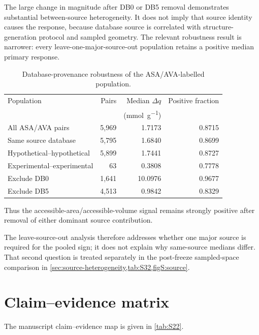\documentclass[11pt,a4paper]{article}
\begin{document}
The large change in magnitude after DB0 or DB5 removal demonstrates substantial
between-source heterogeneity. It does not imply that source identity causes the
response, because database source is correlated with structure-generation protocol
and sampled geometry. The relevant robustness result is narrower: every
leave-one-major-source-out population retains a positive median primary response.

\begin{table}[H]
\centering
\caption{Database-provenance robustness of the ASA/AVA-labelled population.}
\label{tab:S21}
\begin{tabular}{lrrr}
\toprule
Population & Pairs & Median $\Delta q$ & Positive fraction \\
 & & (\si{\milli\mole\per\gram}) & \\
\midrule
All ASA/AVA pairs & 5,969 & 1.7173 & 0.8715 \\
Same source database & 5,795 & 1.6840 & 0.8699 \\
Hypothetical--hypothetical & 5,899 & 1.7441 & 0.8727 \\
Experimental--experimental & 63 & 0.3808 & 0.7778 \\
Exclude DB0 & 1,641 & 10.0976 & 0.9677 \\
Exclude DB5 & 4,513 & 0.9842 & 0.8329 \\
\bottomrule
\end{tabular}
\end{table}

Thus the accessible-area/accessible-volume signal remains strongly positive after
removal of either dominant source contribution.

The leave-source-out analysis therefore addresses whether one major source is
required for the pooled sign; it does not explain why same-source medians differ.
That second question is treated separately in the post-freeze sampled-space
comparison in \cref{sec:source-heterogeneity,tab:S32,figS:source}.

\section{Claim--evidence matrix}
\label{sec:claim-evidence}

The manuscript claim--evidence map is given in \cref{tab:S22}.
\end{document}
